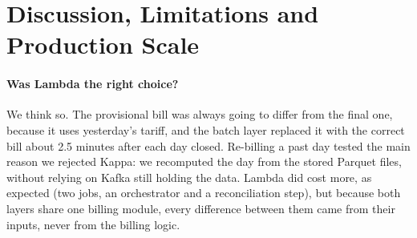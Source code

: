 \documentclass[11pt,a4paper]{article}
\begin{document}
\section{Discussion, Limitations and Production Scale}
\label{sec:limitations}
\label{sec:discussion}

\paragraph{Was Lambda the right choice?} We think so. The provisional bill was always going
to differ from the final one, because it uses yesterday's tariff, and the batch layer
replaced it with the correct bill about 2.5 minutes after each day closed. Re-billing a past
day tested the main reason we rejected Kappa: we recomputed the day from the stored Parquet
files, without relying on Kafka still holding the data. Lambda did cost more, as
expected (two jobs, an orchestrator and a reconciliation step), but because both layers
share one billing module, every difference between them came from their inputs, never
from the billing logic.
\end{document}
